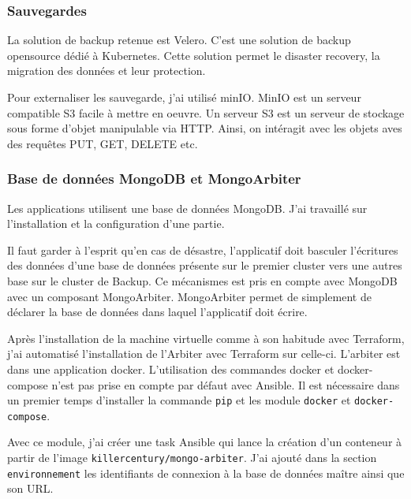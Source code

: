 \documentclass[12pt]{article}
\begin{document}
\subsubsection{Sauvegardes}
La solution de backup retenue est Velero.
C'est une solution de backup opensource dédié à \gls{Kubernetes}.
Cette solution permet le disaster recovery, la migration des données et leur protection.

Pour externaliser les sauvegarde, j'ai utilisé minIO.
MinIO est un serveur compatible S3 facile à mettre en oeuvre.
Un serveur S3 est un serveur de stockage sous forme d'objet manipulable via HTTP.
Ainsi, on intéragit avec les objets aves des requêtes PUT, GET, DELETE etc.

\subsubsection{Base de données MongoDB et MongoArbiter}
Les applications utilisent une base de données MongoDB.
J'ai travaillé sur l'installation et la configuration d'une partie.

Il faut garder à l'esprit qu'en cas de désastre, l'applicatif doit basculer l'écritures des données d'une base de données présente sur le premier \gls{cluster} vers une autres base sur le \gls{cluster} de Backup.
Ce mécanismes est pris en compte avec MongoDB avec un composant MongoArbiter.
MongoArbiter permet de simplement de déclarer la base de données dans laquel l'applicatif doit écrire.

Après l'installation de la machine virtuelle comme à son habitude avec \gls{Terraform}, j'ai automatisé l'installation de l'Arbiter avec \gls{Terraform} sur celle-ci.
L'arbiter est dans une application docker.
L'utilisation des commandes docker et docker-compose n'est pas prise en compte par défaut avec \gls{Ansible}.
Il est nécessaire dans un premier temps d'installer la commande \verb|pip| et les module \verb|docker| et \verb|docker-compose|.

Avec ce module, j'ai créer une task \gls{Ansible} qui lance la création d'un conteneur à partir de l'image \verb|killercentury/mongo-arbiter|.
J'ai ajouté dans la section \verb|environnement| les identifiants de connexion à la base de données maître ainsi que son URL.

\newpage
\end{document}

